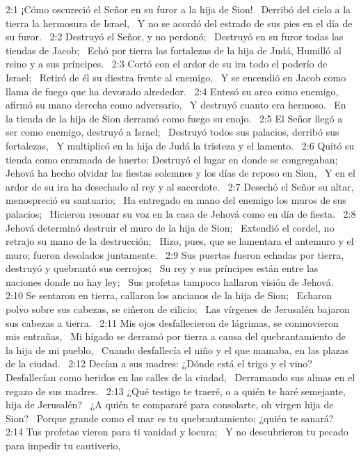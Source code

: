 2:1 ¡Cómo oscureció el Señor en su furor a la hija de Sion!  
Derribó del cielo a la tierra la hermosura de Israel,  
Y no se acordó del estrado de sus pies en el día de su furor.  
2:2 Destruyó el Señor, y no perdonó;  
Destruyó en su furor todas las tiendas de Jacob;  
Echó por tierra las fortalezas de la hija de Judá, 
Humilló al reino y a sus príncipes.  
2:3 Cortó con el ardor de su ira todo el poderío de Israel;  
Retiró de él su diestra frente al enemigo,  
Y se encendió en Jacob como llama de fuego que ha devorado alrededor.  
2:4 Entesó su arco como enemigo, afirmó su mano derecha como adversario,  
Y destruyó cuanto era hermoso.  
En la tienda de la hija de Sion derramó como fuego su enojo.  
2:5 El Señor llegó a ser como enemigo, destruyó a Israel;  
Destruyó todos sus palacios, derribó sus fortalezas,  
Y multiplicó en la hija de Judá la tristeza y el lamento.  
2:6 Quitó su tienda como enramada de huerto; 
Destruyó el lugar en donde se congregaban;  
Jehová ha hecho olvidar las fiestas solemnes y los días de reposo en Sion,  
Y en el ardor de su ira ha desechado al rey y al sacerdote.  
2:7 Desechó el Señor su altar, menospreció su santuario;  
Ha entregado en mano del enemigo los muros de sus palacios;  
Hicieron resonar su voz en la casa de Jehová como en día de fiesta.  
2:8 Jehová determinó destruir el muro de la hija de Sion;  
Extendió el cordel, no retrajo su mano de la destrucción;  
Hizo, pues, que se lamentara el antemuro y el muro; fueron desolados juntamente.  
2:9 Sus puertas fueron echadas por tierra, destruyó y quebrantó sus cerrojos;  
Su rey y sus príncipes están entre las naciones donde no hay ley;  
Sus profetas tampoco hallaron visión de Jehová.  
2:10 Se sentaron en tierra, callaron los ancianos de la hija de Sion;  
Echaron polvo sobre sus cabezas, se ciñeron de cilicio;  
Las vírgenes de Jerusalén bajaron sus cabezas a tierra.  
2:11 Mis ojos desfallecieron de lágrimas, se conmovieron mis entrañas,  
Mi hígado se derramó por tierra a causa del quebrantamiento de la hija de mi pueblo,  
Cuando desfallecía el niño y el que mamaba, en las plazas de la ciudad.  
2:12 Decían a sus madres: ¿Dónde está el trigo y el vino?  
Desfallecían como heridos en las calles de la ciudad,  
Derramando sus almas en el regazo de sus madres.  
2:13 ¿Qué testigo te traeré, o a quién te haré semejante, hija de Jerusalén?  
¿A quién te compararé para consolarte, oh virgen hija de Sion?  
Porque grande como el mar es tu quebrantamiento; ¿quién te sanará?  
2:14 Tus profetas vieron para ti vanidad y locura;  
Y no descubrieron tu pecado para impedir tu cautiverio,  
